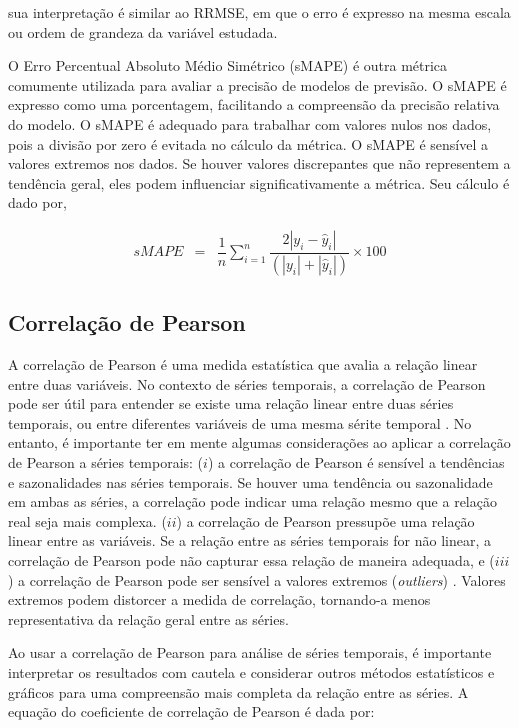  \noindent sua interpretação é similar ao RRMSE, em que o erro é expresso na mesma escala ou ordem de grandeza da variável estudada.
 
O Erro Percentual Absoluto Médio Simétrico (sMAPE) é outra métrica comumente utilizada para avaliar a precisão de modelos de previsão. O sMAPE é expresso como uma porcentagem, facilitando a compreensão da precisão relativa do modelo. O sMAPE é adequado para trabalhar com valores nulos nos dados, pois a divisão por zero é evitada no cálculo da métrica. O sMAPE é sensível a valores extremos nos dados. Se houver valores discrepantes que não representem a tendência geral, eles podem influenciar significativamente a métrica. Seu cálculo é dado por,
  
 \begin{eqnarray}
 	sMAPE &=& \dfrac{1}{n} \sum_{i=1}^{n} \dfrac{2|y_i - \hat{y}_i|}{(|y_i| + |\hat{y}_i|)} \times 100\label{eq:smape}
 \end{eqnarray}
 

\subsection{Correla\c c\~ao de Pearson}

A correlação de Pearson é uma medida estatística que avalia a relação linear entre duas variáveis. No contexto de séries temporais, a correlação de Pearson pode ser útil para entender se existe uma relação linear entre duas séries temporais, ou entre diferentes variáveis de uma mesma sérite temporal \cite{CESARDELIMANOGUEIRA2023128066}. No entanto, é importante ter em mente algumas considerações ao aplicar a correlação de Pearson a séries temporais: ($i$) a correlação de Pearson é sensível a tendências e sazonalidades nas séries temporais. Se houver uma tendência ou sazonalidade em ambas as séries, a correlação pode indicar uma relação mesmo que a relação real seja mais complexa. ($ii$) a correlação de Pearson pressupõe uma relação linear entre as variáveis. Se a relação entre as séries temporais for não linear, a correlação de Pearson pode não capturar essa relação de maneira adequada, e ($iii$) a correlação de Pearson pode ser sensível a valores extremos (\textit{outliers}) \cite{DOSSANTOSCOELHO2024129366}. Valores extremos podem distorcer a medida de correlação, tornando-a menos representativa da relação geral entre as séries.

Ao usar a correlação de Pearson para análise de séries temporais, é importante interpretar os resultados com cautela e considerar outros métodos estatísticos e gráficos para uma compreensão mais completa da relação entre as séries. A equação do coeficiente de correlação de Pearson é dada por:
 
